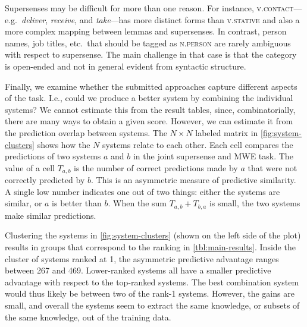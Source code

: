 \documentclass[11pt,letterpaper]{article}
\begin{document}
Supersenses may be difficult for more than one reason. 
For instance, \textsc{v.contact}---e.g.\ \emph{deliver}, \emph{receive}, and \emph{take}---has more distinct forms 
than \textsc{v.stative} and also a more complex mapping between lemmas and supersenses. 
In contrast, person names, job titles, etc.\ that should be tagged as \textsc{n.person} are rarely ambiguous
with respect to supersense. The main challenge in that case is that the category is open-ended 
and not in general evident from syntactic structure.

Finally, we examine whether the submitted approaches capture different aspects of the task. 
I.e., could we produce a better system by combining the individual systems? 
We cannot estimate this from the result tables, since, combinatorially, 
there are many ways to obtain a given score. 
However, we can estimate it from the prediction overlap between systems.
The $N \times N$ labeled matrix in \cref{fig:system-clusters} 
shows how the $N$ systems relate to each other. 
Each cell compares the predictions of two systems $a$ and $b$ in the joint supersense and MWE task. 
The value of a cell $T_{a,b}$ is the number of correct predictions made by $a$ 
that were not correctly predicted by $b$. This is an asymmetric measure of predictive similarity. 
A single low number indicates one out of two things: either the systems are similar, or $a$ is better than $b$. 
When the sum $T_{a,b} + T_{b,a}$ is small, the two systems make similar predictions. 

Clustering the systems in \cref{fig:system-clusters} (shown on the left side of the plot) 
results in groups that correspond to the ranking in \cref{tbl:main-results}. 
Inside the cluster of systems ranked at 1, the asymmetric predictive advantage ranges between 267 and 469. 
Lower-ranked systems all have a smaller predictive advantage with respect to the top-ranked systems. 
The best combination system would thus likely be between two of the rank-1 systems. 
However, the gains are small, and overall the systems seem to extract the same knowledge, 
or subsets of the same knowledge, out of the training data. 
\end{document}
